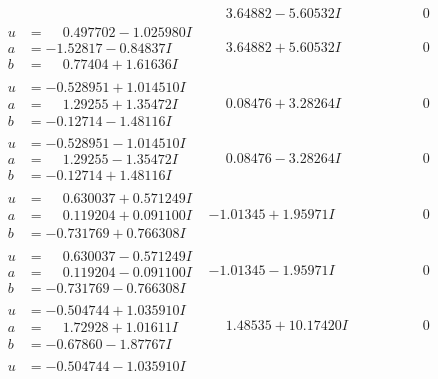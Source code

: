 \documentclass[1p]{elsarticle_modified}
\theoremstyle{definition}
\begin{document}
$$\begin{array}{c|c|c}
 & \phantom{-}3.64882 - 5.60532 I & \phantom{-0.000000 } 0 \\ \hline\begin{aligned}
u &= \phantom{-}0.497702 - 1.025980 I \\
a &= -1.52817 - 0.84837 I \\
b &= \phantom{-}0.77404 + 1.61636 I\end{aligned}
 & \phantom{-}3.64882 + 5.60532 I & \phantom{-0.000000 } 0 \\ \hline\begin{aligned}
u &= -0.528951 + 1.014510 I \\
a &= \phantom{-}1.29255 + 1.35472 I \\
b &= -0.12714 - 1.48116 I\end{aligned}
 & \phantom{-}0.08476 + 3.28264 I & \phantom{-0.000000 } 0 \\ \hline\begin{aligned}
u &= -0.528951 - 1.014510 I \\
a &= \phantom{-}1.29255 - 1.35472 I \\
b &= -0.12714 + 1.48116 I\end{aligned}
 & \phantom{-}0.08476 - 3.28264 I & \phantom{-0.000000 } 0 \\ \hline\begin{aligned}
u &= \phantom{-}0.630037 + 0.571249 I \\
a &= \phantom{-}0.119204 + 0.091100 I \\
b &= -0.731769 + 0.766308 I\end{aligned}
 & -1.01345 + 1.95971 I & \phantom{-0.000000 } 0 \\ \hline\begin{aligned}
u &= \phantom{-}0.630037 - 0.571249 I \\
a &= \phantom{-}0.119204 - 0.091100 I \\
b &= -0.731769 - 0.766308 I\end{aligned}
 & -1.01345 - 1.95971 I & \phantom{-0.000000 } 0 \\ \hline\begin{aligned}
u &= -0.504744 + 1.035910 I \\
a &= \phantom{-}1.72928 + 1.01611 I \\
b &= -0.67860 - 1.87767 I\end{aligned}
 & \phantom{-}1.48535 + 10.17420 I & \phantom{-0.000000 } 0 \\ \hline\begin{aligned}
u &= -0.504744 - 1.035910 I \\

\end{aligned}
\end{array}$$
\end{document}
